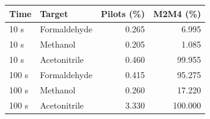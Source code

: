 \begin{tabular}{llrr}\toprule
Time & Target & Pilots (\%) & M2M4 (\%)\\\midrule
10 s & Formaldehyde & 0.265 & 6.995 \\
10 s & Methanol & 0.205 & 1.085 \\
10 s & Acetonitrile & 0.460 & 99.955 \\
100 s & Formaldehyde & 0.415 & 95.275 \\
100 s & Methanol & 0.260 & 17.220 \\
100 s & Acetonitrile & 3.330 & 100.000 \\
\bottomrule\end{tabular}
